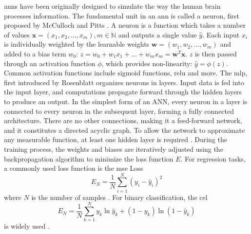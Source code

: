 \documentclass[12pt, a4paper, headinclude, twoside, plainheadsepline, open=right, numbers=noenddot, hidelinks, toc=listof, toc=bibliography]{scrreprt}
\begin{document}
\Acp{ann} have been originally designed to simulate the way the human brain processes information.
The fundamental unit in an \ac{ann} is called a neuron, first proposed by McCulloch and Pitts  \cite{mccullochLogicalCalculusIdeas1943}.
A neuron is a function which takes a number of values $ \mathbf{x} = (x_1, x_2, ... , x_m), m \in \mathbb{N}$ and outputs a single value $\hat{y}$.
Each input $x_i$ is individually weighted by the learnable weights $\mathbf{w} = (w_1, w_2, ... , w_m)$ and added to a bias term $w_0$: $z = w_0 + w_1 x_1 + ... + w_m x_m = \mathbf{w}^T \mathbf{x}$.
$z$ is then passed through an activation function $\phi$, which provides non-linearity: $\hat{y} = \phi(z)$.
Common activation functions include sigmoid functions, \ac{relu} and more.
The \ac{mlp}, first introduced by Rosenblatt \cite{rosenblattPerceptronProbabilisticModel1958a} organizes neurons in layers.
Input data is fed into the input layer, and computations propagate forward through the hidden layers to produce an output. In the simplest form of an ANN, every neuron in a layer is connected to every neuron in the subsequent layer, forming a fully connected architecture. There are no other connections, making it a feed-forward network, and it constitutes a directed acyclic graph. 
To allow the network to approximate any measurable function, at least one hidden layer is required \cite{hornikMultilayerFeedforwardNetworks1989}.
During the training process, the weights and biases are iteratively adjusted using the backpropagation algorithm to minimize the loss function $E$.
For regression tasks, a commonly used loss function is the \ac{mse} Loss
\begin{equation}
E_N = \frac{1}{N} \sum_{i=1}^{N}(y_{i} - \hat{y}_{i})^2
\end{equation}
where $N$ is the number of samples \cite{lianoRobustErrorMeasure1996a}.
 For binary classification, the \ac{cel}
\begin{equation}
E_N = \frac{1}{N} \sum_{k=1}^{N} y_k \ln{\hat{y}_k} + (1-y_k) \ln{(1-\hat{y}_k)}
\end{equation}
is widely used \cite{zhangGeneralizedCrossEntropy2018}.
\end{document}
